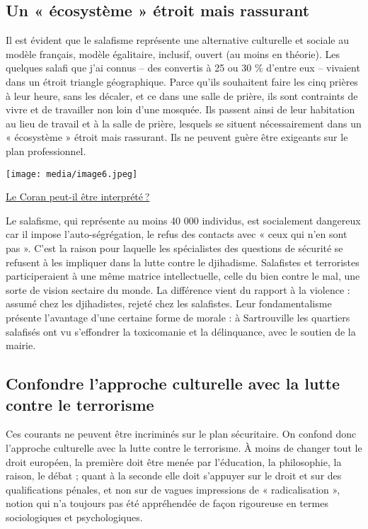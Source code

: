 \subsection{Un « écosystème » étroit mais rassurant}

Il est évident que le salafisme représente une alternative culturelle et
sociale au modèle français, modèle égalitaire, inclusif, ouvert (au
moins en théorie). Les quelques salafi que j'ai connus -- des convertis
à 25 ou 30 \% d'entre eux -- vivaient dans un étroit triangle
géographique. Parce qu'ils souhaitent faire les cinq prières à leur
heure, sans les décaler, et ce dans une salle de prière, ils sont
contraints de vivre et de travailler non loin d'une mosquée. Ils passent
ainsi de leur habitation au lieu de travail et à la salle de prière,
lesquels se situent nécessairement dans un « écosystème » étroit mais
rassurant. Ils ne peuvent guère être exigeants sur le plan
professionnel.

\texttt{[image: media/image6.jpeg]}

\href{https://www.la-croix.com/Religion/Le-Coran-peut-etre-interprete-2021-01-25-1201136852}{Le
Coran peut-il être interprété ?}

Le salafisme, qui représente au moins 40 000 individus, est socialement
dangereux car il impose l'auto-ségrégation, le refus des contacts avec «
ceux qui n'en sont pas ». C'est la raison pour laquelle les spécialistes
des questions de sécurité se refusent à les impliquer dans la lutte
contre le djihadisme. Salafistes et terroristes participeraient à une
même matrice intellectuelle, celle du bien contre le mal, une sorte de
vision sectaire du monde. La différence vient du rapport à la violence :
assumé chez les djihadistes, rejeté chez les salafistes. Leur
fondamentalisme présente l'avantage d'une certaine forme de morale : à
Sartrouville les quartiers salafisés ont vu s'effondrer la toxicomanie
et la délinquance, avec le soutien de la mairie.

\subsection{Confondre l'approche culturelle avec la lutte contre le
terrorisme}

Ces courants ne peuvent être incriminés sur le plan sécuritaire. On
confond donc l'approche culturelle avec la lutte contre le terrorisme. À
moins de changer tout le droit européen, la première doit être menée par
l'éducation, la philosophie, la raison, le débat ; quant à la seconde
elle doit s'appuyer sur le droit et sur des qualifications pénales, et
non sur de vagues impressions de « radicalisation », notion qui n'a
toujours pas été appréhendée de façon rigoureuse en termes sociologiques
et psychologiques.

